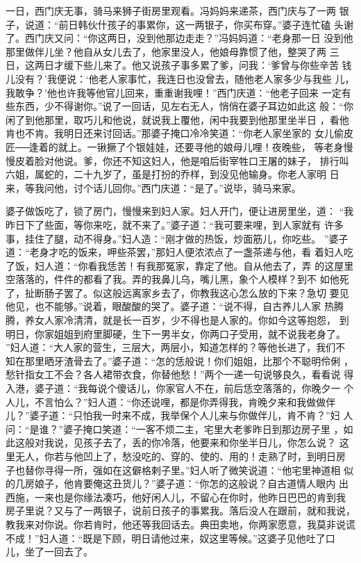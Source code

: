 一日，西门庆无事，骑马来狮子街房里观看。冯妈妈来递茶，西门庆与了一两
银子，说道：“前日韩伙什孩子的事累你，这一两银子，你买布穿。”婆子连忙磕
头谢了。西门庆又问：“你这两日，没到他那边走走？”冯妈妈道：“老身那一日
没到他那里做伴儿坐？他自从女儿去了，他家里没人，他娘母靠惯了他，整哭了两
三日，这两日才缓下些儿来了。他又说孩子事多累了爹，问我：‘爹曾与你些辛苦
钱儿没有？’我便说：‘他老人家事忙，我连日也没曾去，随他老人家多少与我些
儿，我敢争？’他也许我等他官儿回来，重重谢我哩！”西门庆道：“他老子回来
一定有些东西，少不得谢你。”说了一回话，见左右无人，悄俏在婆子耳边如此这
般：“你闲了到他那里，取巧儿和他说，就说我上覆他，闲中我要到他那里坐半日
，看他肯也不肯。我明日还来讨回话。”那婆子掩口冷冷笑道：“你老人家坐家的
女儿偷皮匠──逢着的就上。一锹撅了个银娃娃，还要寻他的娘母儿哩！夜晚些，
等老身慢慢皮着脸对他说。爹，你还不知这妇人，他是咱后街宰牲口王屠的妹子，
排行叫六姐，属蛇的，二十九岁了，虽是打扮的乔样，到没见他输身。你老人家明
日来，等我问他，讨个话儿回你。”西门庆道：“是了。”说毕，骑马来家。

婆子做饭吃了，锁了房门，慢慢来到妇人家。妇人开门，便让进房里坐，道：
“我昨日下了些面，等你来吃，就不来了。”婆子道：“我可要来哩，到人家就有
许多事，挂住了腿，动不得身。”妇人造：“刚才做的热饭，炒面筋儿，你吃些。
”婆子道：“老身才吃的饭来，呷些茶罢，”那妇人便浓浓点了一盏茶递与他，看
着妇人吃了饭，妇人道：“你看我恁苦！有我那冤家，靠定了他。自从他去了，弄
的这屋里空落落的，件件的都看了我。弄的我鼻儿乌，嘴儿黑，象个人模样？到不
如他死了，扯断肠子罢了。似这般远离家乡去了，你教我这心怎么放的下来？急切
要见他见，也不能够。”说着，眼酸酸的哭了。婆子道：“说不得，自古养儿人家
热腾腾，养女人家冷清清，就是长一百岁，少不得也是人家的。你如今这等抱怨，
到明日，你家姐姐到府里脚硬，生下一男半女，你两口子受用，就不说我老身了。
”妇人道：“大人家的营生，三层大，两层小，知道怎样的？等他长进了，我们不
知在那里晒牙渣骨去了。”婆子道：“怎的恁般说！你们姐姐，比那个不聪明伶俐
，愁针指女工不会？各人裙带衣食，你替他愁！”两个一递一句说够良久，看看说
得入港，婆子道：“我每说个傻话儿，你家官人不在，前后恁空落落的，你晚夕一
个人儿，不言怕么？”妇人道：“你还说哩，都是你弄得我，肯晚夕来和我做做伴
儿？”婆子道：“只怕我一时来不成，我举保个人儿来与你做伴儿，肯不肯？”妇
人问：“是谁？”婆子掩口笑道：“一客不烦二主，宅里大老爹昨日到那边房子里
，如此这般对我说，见孩子去了，丢的你冷落，他要来和你坐半日儿，你怎么说？
这里无人，你若与他凹上了，愁没吃的、穿的、使的、用的！走熟了时，到明日房
子也替你寻得一所，强如在这僻格剌子里。”妇人听了微笑说道：“他宅里神道相
似的几房娘子，他肯要俺这丑货儿？”婆子道：“你怎的这般说？自古道情人眼内
出西施，一来也是你缘法凑巧，他好闲人儿，不留心在你时，他昨日巴巴的肯到我
房子里说？又与了一两银子，说前日孩子的事累我。落后没人在跟前，就和我说，
教我来对你说。你若肯时，他还等我回话去。典田卖地，你两家愿意，我莫非说谎
不成！”妇人道：“既是下顾，明日请他过来，奴这里等候。”这婆子见他吐了口
儿，坐了一回去了。

